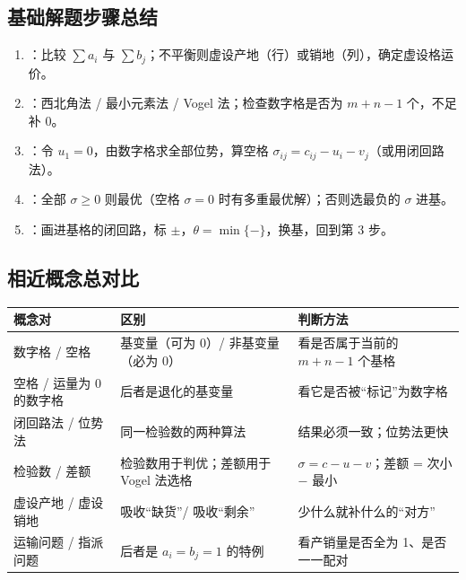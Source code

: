 \subsection*{基础解题步骤总结}
\begin{summarybox}
\begin{enumerate}[label=\textbf{第 \arabic* 步},leftmargin=4.6em]
\item {}：比较 $\sum a_i$ 与 $\sum b_j$；不平衡则虚设产地（行）或销地（列），确定虚设格运价。
\item {}：西北角法 / 最小元素法 / Vogel 法；检查数字格是否为 $m+n-1$ 个，不足补 0。
\item {}：令 $u_1=0$，由数字格求全部位势，算空格 $\sigma_{ij}=c_{ij}-u_i-v_j$（或用闭回路法）。
\item {}：全部 $\sigma\ge0$ 则最优（空格 $\sigma=0$ 时有多重最优解）；否则选最负的 $\sigma$ 进基。
\item {}：画进基格的闭回路，标 $\pm$，$\theta=\min\{-\}$，换基，回到第 3 步。
\end{enumerate}
\end{summarybox}

\subsection*{相近概念总对比}
\begin{center}\small
\begin{tabularx}{\linewidth}{@{}l X X@{}}
\toprule
概念对 & 区别 & 判断方法\\
\midrule
数字格 / 空格 & 基变量（可为 0）/ 非基变量（必为 0） & 看是否属于当前的 $m+n-1$ 个基格\\
空格 / 运量为 0 的数字格 & 后者是退化的基变量 & 看它是否被“标记”为数字格\\
闭回路法 / 位势法 & 同一检验数的两种算法 & 结果必须一致；位势法更快\\
检验数 / 差额 & 检验数用于判优；差额用于 Vogel 法选格 & $\sigma=c-u-v$；差额 = 次小 $-$ 最小\\
虚设产地 / 虚设销地 & 吸收“缺货”/ 吸收“剩余” & 少什么就补什么的“对方”\\
运输问题 / 指派问题 & 后者是 $a_i=b_j=1$ 的特例 & 看产销量是否全为 1、是否一一配对\\
\bottomrule
\end{tabularx}
\end{center}

